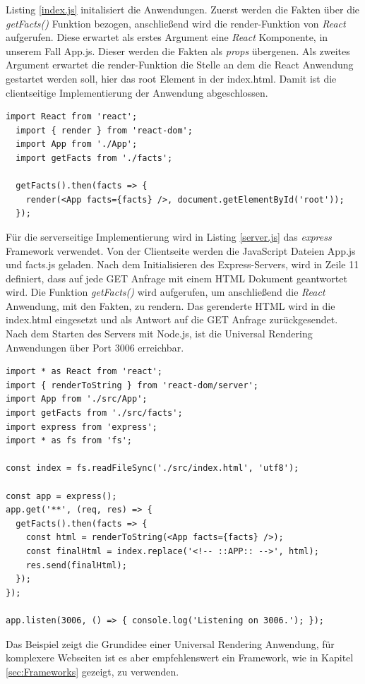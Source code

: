 \documentclass[runningheads]{llncs}
\numberwithin{figure}{section}
\begin{document}
Listing \ref{index.js} initalisiert die Anwendungen. Zuerst werden die Fakten über die
\textit{getFacts()} Funktion bezogen, anschließend wird die render-Funktion von \textit{React}
aufgerufen. Diese erwartet als erstes Argument eine \textit{React} Komponente, in unserem Fall
App.js. Dieser werden die Fakten als \textit{props} übergenen. Als zweites Argument erwartet
die render-Funktion die Stelle an dem die React Anwendung gestartet werden soll, hier das root Element in der
index.html. Damit ist die clientseitige Implementierung der Anwendung abgeschlossen.
\begin{lstlisting}[style=ES6, caption={index.js},label=index.js]
  import React from 'react';
  import { render } from 'react-dom';
  import App from './App';
  import getFacts from './facts';
  
  getFacts().then(facts => {
    render(<App facts={facts} />, document.getElementById('root'));  
  }); 
\end{lstlisting}
Für die serverseitige Implementierung wird in Listing \ref{server.js} das \textit{express} Framework verwendet.
Von der Clientseite werden die JavaScript Dateien App.js und facts.js geladen.
Nach dem Initialisieren des Express-Servers, wird in Zeile 11 definiert, dass auf jede GET Anfrage
mit einem HTML Dokument geantwortet wird. Die Funktion \textit{getFacts()} wird aufgerufen, um 
anschließend die \textit{React} Anwendung, mit den Fakten, zu rendern. Das gerenderte
HTML wird in die index.html eingesetzt und als Antwort auf die GET Anfrage zurückgesendet.
Nach dem Starten des Servers mit Node.js, ist die Universal Rendering Anwendungen über Port 3006 erreichbar.
\newpage
\begin{lstlisting}[style=ES6, caption={server.js},label=server.js]
import * as React from 'react';
import { renderToString } from 'react-dom/server';
import App from './src/App';
import getFacts from './src/facts';
import express from 'express';
import * as fs from 'fs';

const index = fs.readFileSync('./src/index.html', 'utf8');

const app = express();
app.get('**', (req, res) => {
  getFacts().then(facts => {
    const html = renderToString(<App facts={facts} />);
    const finalHtml = index.replace('<!-- ::APP:: -->', html);
    res.send(finalHtml);
  });
});

app.listen(3006, () => { console.log('Listening on 3006.'); });
\end{lstlisting}
Das Beispiel zeigt die Grundidee einer Universal Rendering Anwendung, für komplexere Webseiten ist
es aber empfehlenswert ein Framework, wie in Kapitel \ref{sec:Frameworks} gezeigt, zu verwenden.\cite{east_2017} \cite{kr_2018}
\newpage
\end{document}
